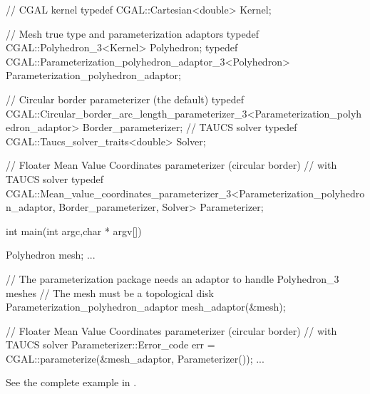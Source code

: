 \begin{ccExampleCode}

// CGAL kernel
typedef CGAL::Cartesian<double>                         Kernel;

// Mesh true type and parameterization adaptors
typedef CGAL::Polyhedron_3<Kernel>                      Polyhedron;
typedef CGAL::Parameterization_polyhedron_adaptor_3<Polyhedron>
                                                        Parameterization_polyhedron_adaptor;

// Circular border parameterizer (the default)
typedef CGAL::Circular_border_arc_length_parameterizer_3<Parameterization_polyhedron_adaptor>
                                                        Border_parameterizer;
// TAUCS solver
typedef CGAL::Taucs_solver_traits<double>               Solver;

// Floater Mean Value Coordinates parameterizer (circular border)
// with TAUCS solver
typedef CGAL::Mean_value_coordinates_parameterizer_3<Parameterization_polyhedron_adaptor,
                                                   Border_parameterizer,
                                                   Solver>
                                                        Parameterizer;

int main(int argc,char * argv[])
{
    Polyhedron mesh;
    ...

    // The parameterization package needs an adaptor to handle Polyhedron_3 meshes
    // The mesh must be a topological disk
    Parameterization_polyhedron_adaptor mesh_adaptor(&mesh);

    // Floater Mean Value Coordinates parameterizer (circular border)
    // with TAUCS solver
    Parameterizer::Error_code err = CGAL::parameterize(&mesh_adaptor, Parameterizer());
    ...
}

\end{ccExampleCode}

See the complete example in .


